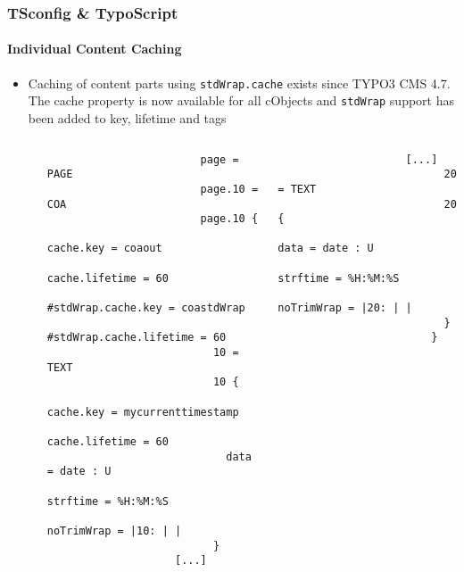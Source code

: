 \begin{frame}[fragile]
	\frametitle{TSconfig \& TypoScript}
	\framesubtitle{Individual Content Caching}

	\lstset{basicstyle=\tiny\ttfamily}

	\begin{itemize}

		\item Caching of content parts using \texttt{stdWrap.cache} exists since TYPO3
			CMS 4.7. The cache property is now available for all cObjects and
			\texttt{stdWrap} support has been added to key, lifetime and tags

			\begin{columns}[T]
				\begin{column}{.07\textwidth}
                \end{column}
				\begin{column}{.465\textwidth}
					\begin{lstlisting}
						page = PAGE
						page.10 = COA
						page.10 {
						  cache.key = coaout
						  cache.lifetime = 60
						  #stdWrap.cache.key = coastdWrap
						  #stdWrap.cache.lifetime = 60
						  10 = TEXT
						  10 {
						    cache.key = mycurrenttimestamp
						    cache.lifetime = 60
						    data = date : U
						    strftime = %H:%M:%S
						    noTrimWrap = |10: | |
						  }
					[...]
					\end{lstlisting}
				\end{column}

				\begin{column}{.465\textwidth}
					\begin{lstlisting}
					[...]
						  20 = TEXT
						  20 {
						    data = date : U
						    strftime = %H:%M:%S
						    noTrimWrap = |20: | |
						  }
						}
					\end{lstlisting}

				\end{column}
			\end{columns}

	\end{itemize}

\end{frame}

